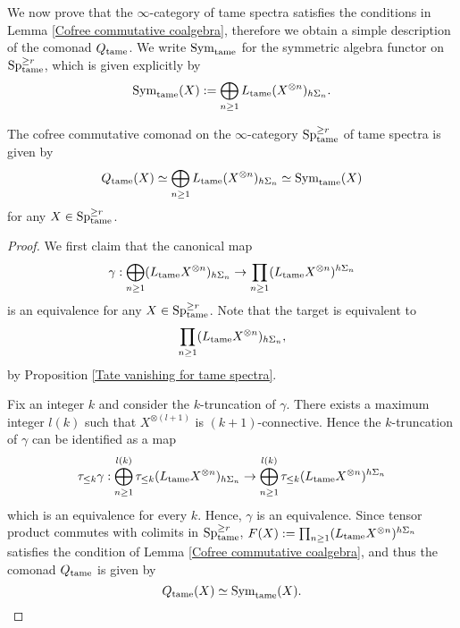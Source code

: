 We now prove that the $\infty$-category of tame spectra satisfies the conditions in Lemma
\ref{Cofree commutative coalgebra}, therefore we obtain a simple description of the comonad $Q_{\operatorname{\operatorname{tame}}}$.
We write $\operatorname{Sym}_{\operatorname{\operatorname{tame}}}$ for the symmetric algebra functor on $\operatorname{Sp}^{\geq r}_{\operatorname{\operatorname{tame}}}$, which is given explicitly by
$$
\operatorname{Sym}_{\operatorname{\operatorname{tame}}}(X) :=\bigoplus_{n\geq 1} L_{\operatorname{\operatorname{tame}}}(X^{\otimes n})_{h\Sigma_n} .
$$
\begin{proposition}
\label{Cofreee commutative comonad}
	The cofree commutative comonad on the $\infty$-category $\operatorname{Sp}^{\geq r}_{\operatorname{\operatorname{tame}}}$ of tame spectra is given by
	 $$
	 Q_{\operatorname{\operatorname{tame}}}(X) \simeq \bigoplus_{n\geq 1} L_{\operatorname{\operatorname{tame}}}(X^{\otimes n})_{h\Sigma_n}
	 \simeq
	 \operatorname{Sym}_{\operatorname{\operatorname{tame}}}(X)
	 $$
	 for any $X \in \operatorname{Sp}^{\geq r}_{\operatorname{\operatorname{tame}}}$.
\end{proposition}
\begin{proof}
We first claim that the canonical map 
    $$
	\gamma: \bigoplus_{n\geq 1} (L_{\operatorname{\operatorname{tame}}}X^{\otimes n})_{h\Sigma_n}
	\to 
	\prod_{n\geq 1} (L_{\operatorname{\operatorname{tame}}}X^{\otimes n})^{h\Sigma_n}
	$$
	is an equivalence for any $X \in \operatorname{Sp}^{\geq r}_{\operatorname{\operatorname{tame}}}$.
    Note that the target is equivalent to 
    $$
    \prod_{n\geq 1} (L_{\operatorname{\operatorname{tame}}} X^{\otimes n})_{h\Sigma_n},
    $$
    by Proposition \ref{Tate vanishing for tame spectra}.
    
	Fix an integer $k$ and consider the $k$-truncation of $\gamma$. There exists a maximum integer $l(k)$ such that $X^{\otimes (l+1)}$ is $(k+1)$-connective.
	Hence the $k$-truncation of $\gamma$ can be identified as a map
	$$
	\tau_{\leq k} \gamma: \bigoplus_{n\geq 1}^{l(k)}
	\tau_{\leq k} (L_{\operatorname{\operatorname{tame}}}X^{\otimes n})_{h\Sigma_n}
	\to 
	\bigoplus_{n\geq 1}^{l(k)}
	\tau_{\leq k} (L_{\operatorname{\operatorname{tame}}}X^{\otimes n})^{h\Sigma_n}
	$$
	 which is an equivalence for every $k$. Hence, $\gamma$ is an equivalence.
	 Since tensor product commutes with colimits in $\operatorname{Sp}^{\geq r}_{\operatorname{\operatorname{tame}}}$, $F(X):=\prod_{n\geq 1} (L_{\operatorname{\operatorname{tame}}} X^{\otimes n})^{h\Sigma_n}$ satisfies the condition of Lemma
    \ref{Cofree commutative coalgebra}, and thus the comonad $Q_{\operatorname{\operatorname{tame}}}$ is given by 
    $$
    Q_{\operatorname{\operatorname{tame}}}(X) \simeq  \operatorname{Sym}_{\operatorname{\operatorname{tame}}}(X).
    $$
	\end{proof}


